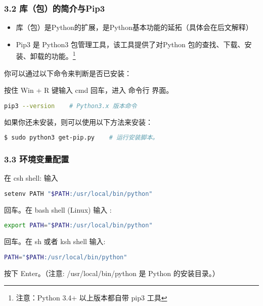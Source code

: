 \subsubsection{3.2 库（包）的简介与Pip3}

\begin{itemize}
\item 库（包）是Python的扩展，是Python基本功能的延拓（具体会在后文解释）
\item Pip3 是 Python3 包管理工具，该工具提供了对Python 包的查找、下载、安装、卸载的功能。\footnote{注意：Python 3.4+ 以上版本都自带 pip3 工具}
\end{itemize}

你可以通过以下命令来判断是否已安装：

按住 Win + R 键输入 cmd 回车，进入 命令行 界面。


\begin{lstlisting}[language=bash]
pip3 --version    # Python3.x 版本命令
\end{lstlisting}

如果你还未安装，则可以使用以下方法来安装：

\begin{lstlisting}[language=bash]
$ sudo python3 get-pip.py    # 运行安装脚本。
\end{lstlisting}

\subsubsection{3.3 环境变量配置}

在 csh shell: 输入

\begin{lstlisting}[language=bash]
setenv PATH "$PATH:/usr/local/bin/python"
\end{lstlisting}

回车。在 bash shell (Linux) 输入 :

\begin{lstlisting}[language=bash]
export PATH="$PATH:/usr/local/bin/python" 
\end{lstlisting}

回车。在 sh 或者 ksh shell 输入:

\begin{lstlisting}[language=bash]
PATH="$PATH:/usr/local/bin/python" 
\end{lstlisting}

按下 Enter。（注意: /usr/local/bin/python 是 Python 的安装目录。）

